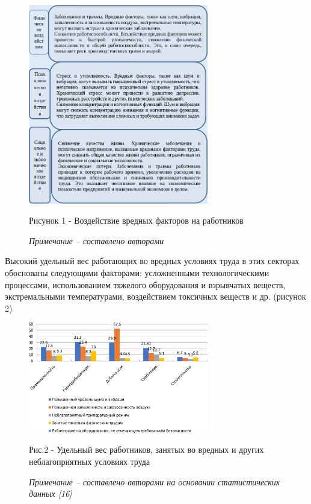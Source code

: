\begin{figure}[H]
	\centering
	\includegraphics[width=0.7\textwidth]{assets/342}
	\caption*{Рисунок 1 - Воздействие вредных факторов на работников}
	\caption*{\normalfont \emph{Примечание -- составлено авторами}}
\end{figure}

Высокий удельный вес работающих во вредных условиях труда в этих
секторах обоснованы следующими факторами: усложненными технологическими
процессами, использованием тяжелого оборудования и взрывчатых веществ,
экстремальными температурами, воздействием токсичных веществ и др.
(рисунок 2)

\begin{figure}[H]
	\centering
	\includegraphics[width=0.7\textwidth]{assets/342.1}
	\caption*{Рис.2 - Удельный вес работников, занятых во вредных и других
неблагоприятных условиях труда}
	\caption*{\normalfont \emph{Примечание -- составлено авторами на основании статистических данных {[}16{]}}}
\end{figure}

